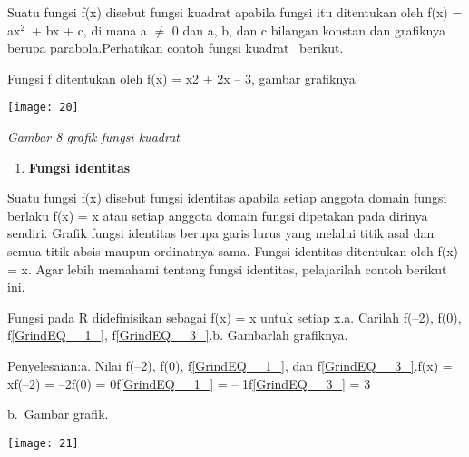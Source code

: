 \documentclass[11pt,fleqn]{book} %
\begin{document}
\noindent 

\noindent Suatu fungsi f(x) disebut fungsi kuadrat apabila fungsi itu ditentukan oleh f(x) = ax${}^{2}$~+ bx + c, di mana a $\mathrm{\neq}$ 0 dan a, b, dan c bilangan konstan dan grafiknya berupa parabola.Perhatikan contoh fungsi kuadrat ~berikut.

Fungsi f ditentukan oleh f(x) = x2 + 2x -- 3, gambar grafiknya

\begin{center}
\noindent \texttt{[image: 20]}
\end{center}

\textit{     Gambar 8 grafik fungsi kuadrat}

\textbf{\textit{}}

\begin{enumerate}
\item \textbf{\textit{ }Fungsi identitas}
\end{enumerate}

\noindent \textbf{}

\noindent Suatu fungsi f(x) disebut fungsi identitas apabila setiap anggota domain fungsi berlaku f(x) = x atau setiap anggota domain fungsi dipetakan pada dirinya sendiri. Grafik fungsi identitas berupa garis lurus yang melalui titik asal dan semua titik absis maupun ordinatnya sama. Fungsi identitas ditentukan oleh f(x) = x. Agar lebih memahami tentang fungsi identitas, pelajarilah contoh berikut ini.

\noindent Fungsi pada R didefinisikan sebagai f(x) = x untuk setiap x.a. Carilah f(--2), f(0), f\eqref{GrindEQ__1_}, f\eqref{GrindEQ__3_}.b. Gambarlah grafiknya.

\noindent Penyelesaian:a. Nilai f(--2), f(0), f\eqref{GrindEQ__1_}, dan f\eqref{GrindEQ__3_}.f(x) = xf(--2) = --2f(0) = 0f\eqref{GrindEQ__1_} = -- 1f\eqref{GrindEQ__3_} = 3

\noindent 

\noindent 

\noindent 

\noindent 

\noindent 

\noindent 

\noindent 

\noindent 

\noindent b.~Gambar grafik.

\begin{center}
\noindent \texttt{[image: 21]}
\end{center}
\end{document}
